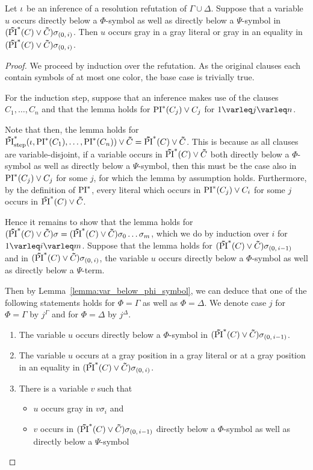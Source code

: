 \begin{lemma}
	\label{lemma:col_change}
	Let $\iota$ be an inference of a resolution refutation of $\Gamma \cup \Delta$.
	Suppose that a variable $u$ occurs directly below a $\Phi$-symbol as well as directly below a $\Psi$-symbol in $(\bm\tilde{\operatorname{PI}}^{*}(C)\lor \bm\tilde{C})\sigma_{(0,\,i)}$.
	Then $u$ occurs gray in a gray literal or gray in an equality in $(\bm\tilde{\operatorname{PI}}^{*}(C)\lor \bm\tilde{C})\sigma_{(0,\,i)}$.
\end{lemma}
\begin{proof}
	We proceed by induction over the refutation.
	As the original clauses each contain symbols of at most one color, the base case is trivially true.

	For the induction step, suppose that an inference makes use of the clauses $C_1, \dots, C_n$ and that the lemma holds for $\operatorname{PI}^*(C_j) \lor C_j$ for $1\varleq j \varleq n$. 

	Note that then, the lemma holds for $\bm\tilde{\operatorname{PI}}^{*}_{\mathrm{step}}(\iota, \operatorname{PI}^*(C_1), \dots, \operatorname{PI}^*(C_n)) \lor \bm\tilde{C} = \bm\tilde{\operatorname{PI}}^{*}(C)\lor \bm\tilde{C}$.
	This is because as all clauses are variable-disjoint, 
	if a variable occurs in $\bm\tilde{\operatorname{PI}}^{*}(C)\lor \bm\tilde{C}$ both directly below a $\Phi$-symbol as well as directly below a $\Psi$-symbol, then this must be the case also in 
	$\operatorname{PI}^*(C_j) \lor C_j$ for some $j$, for which the lemma by assumption holds.
	Furthermore, by the definition of $\operatorname{PI}^*$, every literal which occurs in $\operatorname{PI}^*(C_j) \lor C_i$ for some $j$ occurs in $\bm\tilde{\operatorname{PI}}^{*}(C)\lor \bm\tilde{C}$.

	Hence it remains to show that the lemma holds for $(\bm\tilde{\operatorname{PI}}^{*}(C)\lor \bm\tilde{C})\sigma = (\bm\tilde{\operatorname{PI}}^{*}(C)\lor \bm\tilde{C})\sigma_0\dots\sigma_m$, which we do by induction over $i$ for $1\varleq i \varleq m$.
	Suppose that the lemma holds for $(\bm\tilde{\operatorname{PI}}^{*}(C)\lor \bm\tilde{C})\sigma_{(0,\,i-1)}$ and in $(\bm\tilde{\operatorname{PI}}^{*}(C)\lor \bm\tilde{C})\sigma_{(0,\,i)}$, the variable $u$ occurs directly below a $\Phi$-symbol as well as directly below a $\Psi$-term.

	Then by Lemma~\ref{lemma:var_below_phi_symbol}, we can deduce that one of the following statements holds for $\Phi = \Gamma$ as well as $\Phi = \Delta$. We denote case $j$ for $\Phi = \Gamma$ by $j^\Gamma$ and for $\Phi = \Delta$ by $j^\Delta$.

	\begin{enumerate}
		\item
			\label{16_1}
			The variable $u$ occurs directly below a $\Phi$-symbol in $(\bm\tilde{\operatorname{PI}}^{*}(C)\lor \bm\tilde{C})\sigma_{(0,\,i-1)}$.

		\item
			\label{16_4}
			The variable $u$ occurs at a gray position in a gray literal or at a gray position in an equality in $(\bm\tilde{\operatorname{PI}}^{*}(C)\lor \bm\tilde{C})\sigma_{(0,\,i)}$.

		\item 
			\label{16_2}
			There is a variable $v$ such that 
			{
				\renewcommand{\labelitemi}{\textendash}
				\begin{itemize}
					\item $u$ occurs gray in $v\sigma_i$ and
					\item $v$ occurs in $(\bm\tilde{\operatorname{PI}}^{*}(C)\lor \bm\tilde{C})\sigma_{(0,\,i-1)}$ directly below a $\Phi$-symbol as well as directly below a $\Psi$-symbol
				\end{itemize}
			}
	\end{enumerate}


\end{proof}
